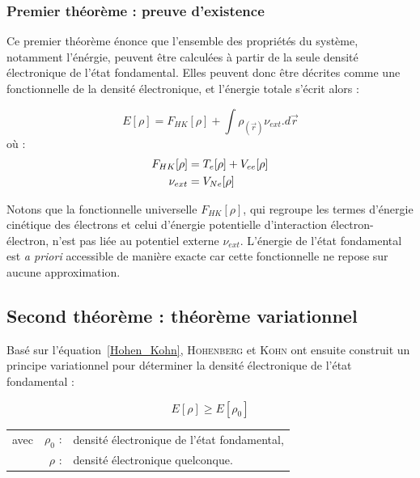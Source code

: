 \subsubsection{Premier théorème : preuve d'existence}

Ce premier théorème énonce que l'ensemble des propriétés du système, notamment l'énérgie, peuvent être calculées à partir de la seule densité électronique de l'état fondamental. Elles peuvent donc être décrites comme une fonctionnelle de la densité électronique, et l'énergie totale s'écrit alors :

\begin{equation}
E[\rho] = F_{HK}[\rho] + \int \rho_{(\vec{r})} \nu_{ext} .d\vec{r}
\label{Hohen_Kohn}
\end{equation}
\noindent où :
\begin{align}
F_{HK}[\rho] &= T_{e}[\rho] + V_{ee}[\rho] \\
\nu_{ext} &= V_{Ne}[\rho] \notag
\end{align}

Notons que la fonctionnelle universelle $F_{HK}[\rho]$, qui regroupe les termes d'énergie cinétique des électrons et celui d'énergie potentielle d'interaction électron-électron, n'est pas liée au potentiel externe $\nu_{ext}$. L'énergie de l'état fondamental est \textit{a priori} accessible de manière exacte car cette fonctionnelle ne repose sur aucune approximation.

\subsection{Second théorème : théorème variationnel}

Basé sur l'équation~\ref{Hohen_Kohn}, \textsc{Hohenberg} et \textsc{Kohn} ont ensuite construit un principe variationnel pour déterminer la densité électronique de l'état fondamental :

\begin{equation}
E[\rho] \geq E[\rho_{0}]
\end{equation}

\begin{flushleft}
\begin{tabular}{@{}lrp{10cm}}
avec & $\rho_{0}$ : & densité électronique de l'état fondamental, \\
& $\rho$ : & densité électronique quelconque.
\end{tabular}
\end{flushleft}

